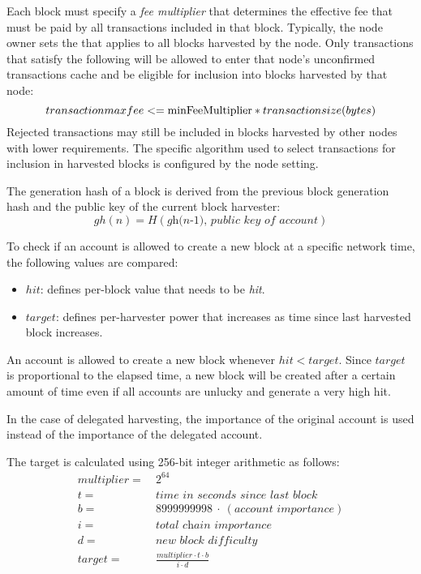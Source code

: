 
Each block must specify a \textit{fee multiplier} that determines the effective fee that must be paid by all transactions included in that block.
Typically, the node owner sets the  that applies to all blocks harvested by the node.
Only transactions that satisfy the following will be allowed to enter that node's unconfirmed transactions cache and be eligible for inclusion into blocks harvested by that node:
$$transaction max fee <= \nemsetting{node}{minFeeMultiplier} * transaction size (bytes)$$
Rejected transactions may still be included in blocks harvested by other nodes with lower requirements.
The specific algorithm used to select transactions for inclusion in harvested blocks is configured by the  node setting.


The generation hash of a block is derived from the previous block generation hash and the public key of the current block harvester:
\begin{equation}
\tag{generation hash} \mathit{gh(n)} = H(\textit{gh(n-1), public key of account})
\end{equation}

To check if an account is allowed to create a new block at a specific network time, the following values are compared:
\begin{itemize}
\item{ $hit$: defines per-block value that needs to be \textit{hit}.}
\item{ $target$: defines per-harvester power that increases as time since last harvested block increases.}
\end{itemize}
An account is allowed to create a new block whenever $\mathit{hit} < \mathit{target}$.
Since $\mathit{target}$ is proportional to the elapsed time, a new block will be created after a certain amount of time even if all accounts are unlucky and generate a very high hit.

In the case of delegated harvesting, the importance of the original account is used instead of the importance of the delegated account.

The target is calculated using 256-bit integer arithmetic as follows:
\begin{align*}
multiplier = \: & 2^{64} \\
t = \: & \textit{time in seconds since last block} \\
b = \: & 8999999998 \: \cdot \: (\textit{account importance}) \\
i = \: & \textit{total chain importance} \\
d = \: & \textit{new block difficulty} \\
target = \: & \frac{multiplier \cdot t \cdot b}{i \cdot d}
\end{align*}

